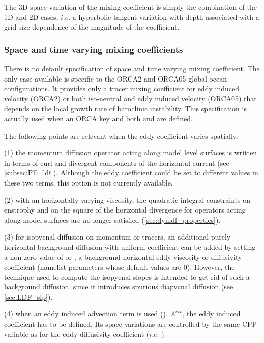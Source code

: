 \documentclass[../main/NEMO_manual]{subfiles}
\begin{document}
The 3D space variation of the mixing coefficient is simply the combination of the 1D and 2D cases,
$i.e.$ a hyperbolic tangent variation with depth associated with a grid size dependence of
the magnitude of the coefficient. 

\subsubsection{Space and time varying mixing coefficients}

There is no default specification of space and time varying mixing coefficient. 
The only case available is specific to the ORCA2 and ORCA05 global ocean configurations.
It provides only a tracer mixing coefficient for eddy induced velocity (ORCA2) or both iso-neutral and
eddy induced velocity (ORCA05) that depends on the local growth rate of baroclinic instability.
This specification is actually used when an ORCA key and both  and  are defined.

The following points are relevant when the eddy coefficient varies spatially:

(1) the momentum diffusion operator acting along model level surfaces is written in terms of curl and
divergent components of the horizontal current (see \autoref{subsec:PE_ldf}).
Although the eddy coefficient could be set to different values in these two terms,
this option is not currently available. 

(2) with an horizontally varying viscosity, the quadratic integral constraints on enstrophy and on the square of
the horizontal divergence for operators acting along model-surfaces are no longer satisfied
(\autoref{sec:dynldf_properties}).

(3) for isopycnal diffusion on momentum or tracers, an additional purely horizontal background diffusion with
uniform coefficient can be added by setting a non zero value of  or ,
a background horizontal eddy viscosity or diffusivity coefficient
(namelist parameters whose default values are $0$).
However, the technique used to compute the isopycnal slopes is intended to get rid of such a background diffusion,
since it introduces spurious diapycnal diffusion (see \autoref{sec:LDF_slp}).

(4) when an eddy induced advection term is used (),
$A^{eiv}$, the eddy induced coefficient has to be defined.
Its space variations are controlled by the same CPP variable as for the eddy diffusivity coefficient
($i.e.$ ). 
\end{document}
